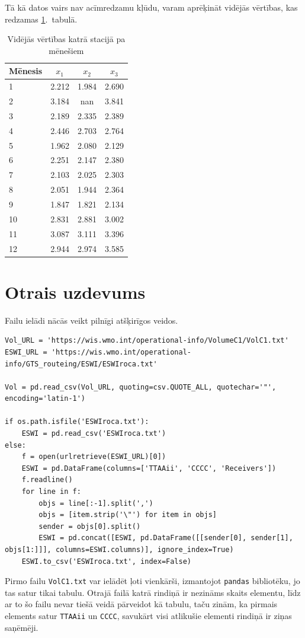 \documentclass[12pt,a4paper]{article}
\begin{document}
Tā kā datos vairs nav acīmredzamu kļūdu, varam aprēķināt vidējās vērtības, kas redzamas \ref{tab:videjais}.~tabulā.


\begin{table}
    \caption{Vidējās vērtības katrā stacijā pa mēnešiem}\label{tab:videjais}
    \centering
    \begin{tabular}{l|c c c}
        \toprule
        Mēnesis & \(x_1\) & \(x_2\) & \(x_3\) \\
        \midrule
        1  &  2.212  &  1.984  &  2.690 \\
        2  &  3.184  &  nan  &  3.841 \\
        3  &  2.189  &  2.335  &  2.389 \\
        4  &  2.446  &  2.703  &  2.764 \\
        5  &  1.962  &  2.080  &  2.129 \\
        6  &  2.251  &  2.147  &  2.380 \\
        7  &  2.103  &  2.025  &  2.303 \\
        8  &  2.051  &  1.944  &  2.364 \\
        9  &  1.847  &  1.821  &  2.134 \\
        10  &  2.831  &  2.881  &  3.002 \\
        11  &  3.087  &  3.111  &  3.396 \\
        12  &  2.944  &  2.974  &  3.585\\
        \bottomrule
    \end{tabular}
\end{table}



\section*{Otrais uzdevums}
Failu ielādi nācās veikt pilnīgi atšķirīgos veidos.

\begin{lstlisting}[breaklines]
Vol_URL = 'https://wis.wmo.int/operational-info/VolumeC1/VolC1.txt'
ESWI_URL = 'https://wis.wmo.int/operational-info/GTS_routeing/ESWI/ESWIroca.txt'

Vol = pd.read_csv(Vol_URL, quoting=csv.QUOTE_ALL, quotechar='"', encoding='latin-1')

if os.path.isfile('ESWIroca.txt'):
    ESWI = pd.read_csv('ESWIroca.txt')
else:
    f = open(urlretrieve(ESWI_URL)[0])
    ESWI = pd.DataFrame(columns=['TTAAii', 'CCCC', 'Receivers'])
    f.readline()
    for line in f:
        objs = line[:-1].split(',')
        objs = [item.strip('\"') for item in objs]
        sender = objs[0].split()
        ESWI = pd.concat([ESWI, pd.DataFrame([[sender[0], sender[1], objs[1:]]], columns=ESWI.columns)], ignore_index=True)
    ESWI.to_csv('ESWIroca.txt', index=False)
\end{lstlisting}
Pirmo failu \texttt{VolC1.txt} var ielādēt ļoti vienkārši, izmantojot \texttt{pandas} bibliotēku, jo tas satur tikai tabulu. Otrajā failā katrā rindiņā ir nezināms skaits elementu, līdz ar to šo failu nevar tiešā veidā pārveidot kā tabulu, taču zinām, ka pirmais elements satur \texttt{TTAAii} un \texttt{CCCC}, savukārt visi atlikušie elementi rindiņā ir ziņas saņēmēji.
\end{document}
